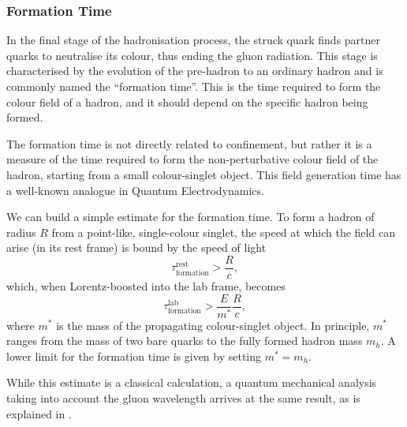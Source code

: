 \subsubsection{Formation Time}
\label{10.33::formation_time}
    In the final stage of the hadronisation process, the struck quark finds partner quarks to neutralise its colour, thus ending the gluon radiation.
    This stage is characterised by the evolution of the pre-hadron to an ordinary hadron and is commonly named the ``formation time''.
    This is the time required to form the colour field of a hadron, and it should depend on the specific hadron being formed.

    The formation time is not directly related to confinement, but rather it is a measure of the time required to form the non-perturbative colour field of the hadron, starting from a small colour-singlet object.
    This field generation time has a well-known analogue in Quantum Electrodynamics.

    We can build a simple estimate for the formation time.
    To form a hadron of radius $R$ from a point-like, single-colour singlet, the speed at which the field can arise (in its rest frame) is bound by the speed of light
    \begin{equation*}
        \tau^\text{rest}_\text{formation} > \frac{R}{c},
    \end{equation*}
    which, when Lorentz-boosted into the lab frame, becomes
    \begin{equation*}
        \tau^\text{lab}_\text{formation} > \frac{E}{m^*} \frac{R}{c},
    \end{equation*}
    where $m^*$ is the mass of the propagating colour-singlet object.
    In principle, $m^*$ ranges from the mass of two bare quarks to the fully formed hadron mass $m_h$.
    A lower limit for the formation time is given by setting $m^* = m_h$.

    While this estimate is a classical calculation, a quantum mechanical analysis taking into account the gluon wavelength arrives at the same result, as is explained in \cite{dokshitzer1991}.

